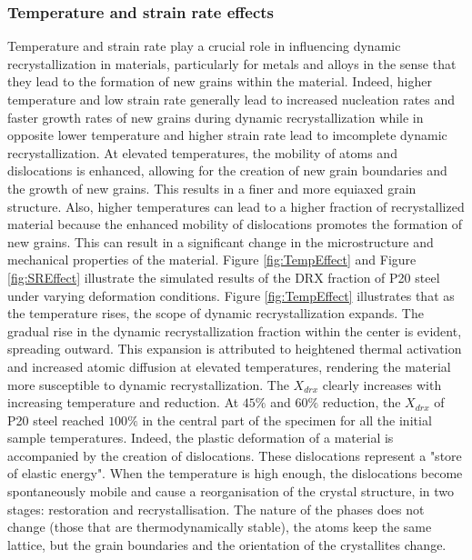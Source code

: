 \documentclass[metals,article,submit,pdftex,moreauthors]{Definitions/mdpi}
\begin{document}
\subsubsection{Temperature and strain rate effects \label{subsec:TempSReffect}}

Temperature and strain rate play a crucial role in influencing dynamic recrystallization in materials, particularly for metals and alloys in the sense that they lead to the formation of new grains within the material.
Indeed, higher temperature and low strain rate generally lead to increased nucleation rates and faster growth rates of new grains during dynamic recrystallization while in opposite lower temperature and higher strain rate lead to imcomplete dynamic recrystallization.
At elevated temperatures, the mobility of atoms and dislocations is enhanced, allowing for the creation of new grain boundaries and the growth of new grains.
This results in a finer and more equiaxed grain structure.
Also, higher temperatures can lead to a higher fraction of recrystallized material because the enhanced mobility of dislocations promotes the formation of new grains.
This can result in a significant change in the microstructure and mechanical properties of the material.
Figure \ref{fig:TempEffect} and Figure \ref{fig:SREffect} illustrate the simulated results of the DRX fraction of P20 steel under varying deformation conditions.
Figure \ref{fig:TempEffect} illustrates that as the temperature rises, the scope of dynamic recrystallization expands.
The gradual rise in the dynamic recrystallization fraction within the center is evident, spreading outward.
This expansion is attributed to heightened thermal activation and increased atomic diffusion at elevated temperatures, rendering the material more susceptible to dynamic recrystallization.
The $X_{drx}$ clearly increases with increasing temperature and reduction.
At $45\%$ and $60\%$ reduction, the $X_{drx}$ of P20 steel
reached $100\%$ in the central part of the specimen for all the initial sample temperatures.
Indeed, the plastic deformation of a material is accompanied by the creation of dislocations.
These dislocations represent a "store of elastic energy".
When the temperature is high enough, the dislocations become spontaneously mobile and cause a reorganisation of the crystal structure, in two stages: restoration and recrystallisation.
The nature of the phases does not change (those that are thermodynamically stable), the atoms keep the same lattice, but the grain boundaries and the orientation of the crystallites change.
\end{document}
